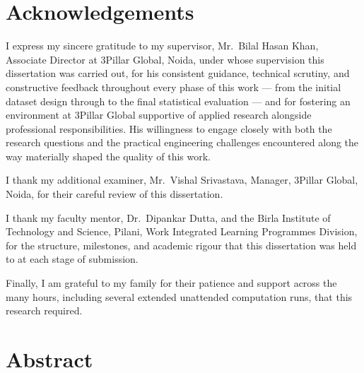 
\chapter*{Acknowledgements}


I express my sincere gratitude to my supervisor, Mr.~Bilal Hasan Khan,
Associate Director at 3Pillar Global, Noida, under whose supervision
this dissertation was carried out, for his consistent guidance,
technical scrutiny, and constructive feedback throughout every phase of
this work --- from the initial dataset design through to the final
statistical evaluation --- and for fostering an environment at 3Pillar
Global supportive of applied research alongside professional
responsibilities. His willingness to engage closely with both the
research questions and the practical engineering challenges encountered
along the way materially shaped the quality of this work.

I thank my additional examiner, Mr.~Vishal Srivastava, Manager, 3Pillar
Global, Noida, for their careful review of this dissertation.

I thank my faculty mentor, Dr.~Dipankar Dutta, and the Birla Institute
of Technology and Science, Pilani, Work Integrated Learning Programmes
Division, for the structure, milestones, and academic rigour that this
dissertation was held to at each stage of submission.

Finally, I am grateful to my family for their patience and support
across the many hours, including several extended unattended computation
runs, that this research required.

\chapter*{Abstract}

